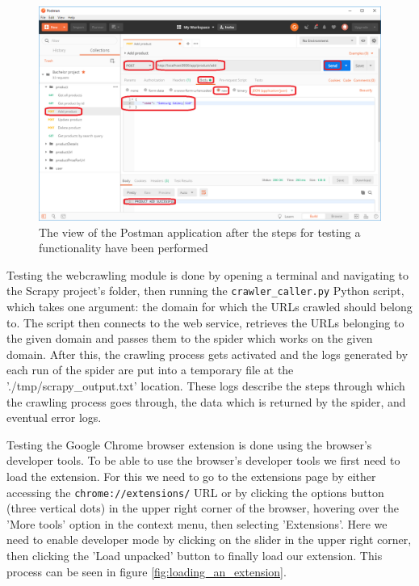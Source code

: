 \documentclass[12pt,a4paper,twoside]{report}
\begin{document}
\begin{figure}[ht]
  \centering
  \includegraphics[width=\linewidth]{img/postman_add_product_example.png}
  \caption[]{The view of the Postman application after the steps for testing a functionality have been performed}
  \label{fig:postman_add_product_example}
\end{figure}

Testing the webcrawling module is done by opening a terminal and navigating to the Scrapy project's folder, then running the \lstinline$crawler_caller.py$ Python script, which takes one argument: the domain for which the URLs crawled should belong to. The script then connects to the web service, retrieves the URLs belonging to the given domain and passes them to the spider which works on the given domain. After this, the crawling process gets activated and the logs generated by each run of the spider are put into a temporary file at the './tmp/scrapy\_output.txt' location. These logs describe the steps through which the crawling process goes through, the data which is returned by the spider, and eventual error logs.

Testing the Google Chrome browser extension is done using the browser's developer tools. To be able to use the browser's developer tools we first need to load the extension. For this we need to go to the extensions page by either accessing the \lstinline$chrome://extensions/$ URL or by clicking the options button (three vertical dots) in the upper right corner of the browser, hovering over the 'More tools' option in the context menu, then selecting 'Extensions'. Here we need to enable developer mode by clicking on the slider in the upper right corner, then clicking the 'Load unpacked' button to finally load our extension. This process can be seen in figure \ref{fig:loading_an_extension}.
\end{document}
